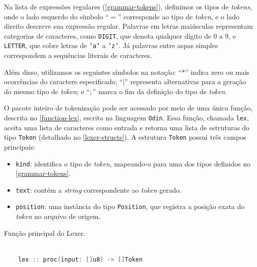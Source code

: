 
Na lista de expressões regulares (\autoref{grammar-tokens}), definimos os tipos de \textit{tokens}, onde o lado esquerdo do símbolo ``$=$'' corresponde ao tipo de \textit{token}, e o lado direito descreve sua expressão regular. Palavras em letras maiúsculas representam categorias de caracteres, como \texttt{DIGIT}, que denota qualquer dígito de 0 a 9, e \texttt{LETTER}, que cobre letras de \texttt{'a'} a \texttt{'z'}. Já palavras entre aspas simples correspondem a sequências literais de caracteres.

Além disso, utilizamos os seguintes símbolos na notação: ``$*$'' indica zero ou mais ocorrências do caractere especificado; ``$|$'' representa alternativas para a geração do mesmo tipo de \textit{token}; e ``$;$'' marca o fim da definição do tipo de \textit{token}.


O pacote inteiro de tokenização pode ser acessado por meio de uma única função, descrita no \autoref{function-lex}, escrita na linguagem \texttt{Odin}. Essa função, chamada \texttt{lex}, aceita uma lista de caracteres como entrada e retorna uma lista de estruturas do tipo \texttt{Token} (detalhado no \autoref{lexer-structs}). A estrutura \texttt{Token} possui três campos principais:

\begin{itemize}
    \item \texttt{kind}: identifica o tipo de \textit{token}, mapeando-o para uma dos tipos definidos no \autoref{grammar-tokens}.
    \item \texttt{text}: contém a \textit{string} correspondente ao \textit{token} gerado.
    \item \texttt{position}: uma instância do tipo \texttt{Position}, que registra a posição exata do \textit{token} no arquivo de origem.
\end{itemize}


\begin{codigo}[htb]
        \caption{\small Função principal do Lexer. }
        \label{function-lex}
\begin{lstlisting}[language = c]
  
    lex :: proc(input: []u8) -> []Token
\end{lstlisting}
\end{codigo}



